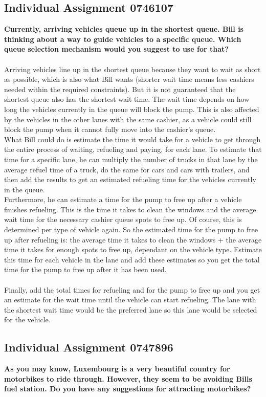 \subsection{Individual Assignment 0746107}\label{app:indivbram}
\textbf{Currently, arriving vehicles queue up in the shortest queue. Bill is thinking about a way to guide vehicles to a specific queue. Which queue selection mechanism would you suggest to use for that?}\\
\\
Arriving vehicles line up in the shortest queue because they want to wait as short as possible, which is also what Bill wants (shorter wait time means less cashiers needed within the required constraints). But it is not guaranteed that the shortest queue also has the shortest wait time. The wait time depends on how long the vehicles currently in the queue will block the pump. This is also affected by the vehicles in the other lanes with the same cashier, as a vehicle could still block the pump when it cannot fully move into the cashier's queue.\\
What Bill could do is estimate the time it would take for a vehicle to get through the entire process of waiting, refueling and paying, for each lane. To estimate that time for a specific lane, he can multiply the number of trucks in that lane by the average refuel time of a truck, do the same for cars and cars with trailers, and then add the results to get an estimated refueling time for the vehicles currently in the queue.\\
Furthermore, he can estimate a time for the pump to free up after a vehicle finishes refueling. This is the time it takes to clean the windows and the average wait time for the necessary cashier queue spots to free up. Of course, this is determined per type of vehicle again. So the estimated time for the pump to free up after refueling is: the average time it takes to clean the windows + the average time it takes for enough spots to free up, dependant on the vehicle type. Estimate this time for each vehicle in the lane and add these estimates so you get the total time for the pump to free up after it has been used.\\\\
Finally, add the total times for refueling and for the pump to free up and you get an estimate for the wait time until the vehicle can start refueling. The lane with the shortest wait time would be the preferred lane so this lane would be selected for the vehicle.
\newpage
\subsection{Individual Assignment 0747896}\label{app:indivrobbert}
\textbf{As you may know, Luxembourg is a very beautiful country for motorbikes to ride through. However, they seem to be avoiding Bills fuel station. Do you have any suggestions for attracting motorbikes?}

